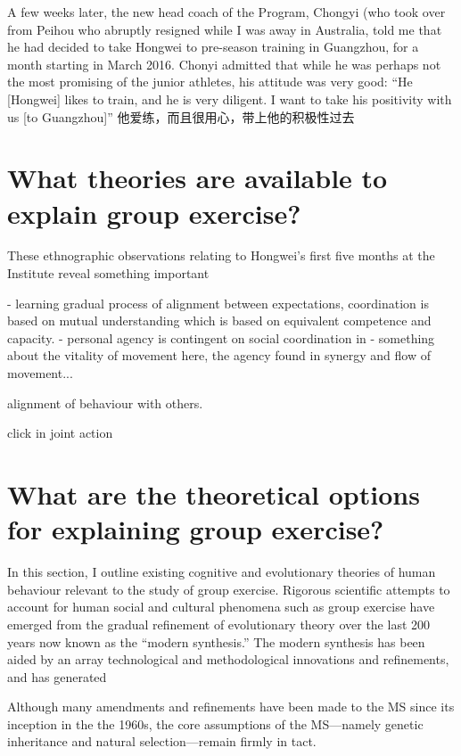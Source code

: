 
A few weeks later, the new head coach of the Program, Chongyi (who took over from Peihou who abruptly resigned while I was away in Australia, told me that he had decided to take Hongwei to pre-season training in Guangzhou, for a month starting in March 2016.  Chonyi admitted that while he was perhaps not the most promising of the junior athletes, his attitude was very good: ``He [Hongwei] likes to train, and he is very diligent. I want to take his positivity with us [to Guangzhou]'' 他爱练，而且很用心，带上他的积极性过去


\section{What theories are available to explain group exercise?}


These ethnographic observations relating to Hongwei's first five months at the Institute reveal something important

- learning gradual process of alignment between expectations, coordination is based on mutual understanding which is based on equivalent competence and capacity.
- personal agency is contingent on social coordination in
- something about the vitality of movement here, the agency found in synergy and flow of movement...

alignment of behaviour with others.

click in joint action




\section{What are the theoretical options for explaining group exercise?}

In this section, I outline existing cognitive and evolutionary theories of human behaviour relevant to the study of group exercise.  Rigorous scientific attempts to account for human social and cultural phenomena such as group exercise have emerged from the gradual refinement of evolutionary theory over the last 200 years now known as the ``modern synthesis.''  The modern synthesis has been aided by an array technological and methodological innovations and refinements, and has generated

Although many amendments and refinements have been made to the MS since its inception in the the 1960s, the core assumptions of the MS---namely genetic inheritance and natural selection---remain firmly in tact.

